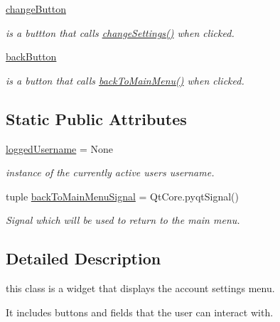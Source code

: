 \begin{DoxyCompactItemize}
\hyperlink{classsrc_1_1settings__menu_1_1_account_settings_menu_a6ad9267209290b0eaa3ef35191f81d82}{change\+Button}
\begin{DoxyCompactList}\small\item\em is a buttton that calls \hyperlink{classsrc_1_1settings__menu_1_1_account_settings_menu_a10989536edbbe0db4fc03f2e5ccc8271}{change\+Settings()} when clicked. \end{DoxyCompactList}\item 
\hyperlink{classsrc_1_1settings__menu_1_1_account_settings_menu_a80552690cf6643721ebc00319289468a}{back\+Button}
\begin{DoxyCompactList}\small\item\em is a button that calls \hyperlink{classsrc_1_1settings__menu_1_1_account_settings_menu_a47dc6e6cb8a9ca5431a32ad73298ed81}{back\+To\+Main\+Menu()} when clicked. \end{DoxyCompactList}\end{DoxyCompactItemize}
\subsection*{Static Public Attributes}
\begin{DoxyCompactItemize}
\item 
\hyperlink{classsrc_1_1settings__menu_1_1_account_settings_menu_a7cac3d6c4fd01c1d0c9e6cfcba8e8950}{logged\+Username} = None
\begin{DoxyCompactList}\small\item\em instance of the currently active user\textquotesingle{}s username. \end{DoxyCompactList}\item 
tuple \hyperlink{classsrc_1_1settings__menu_1_1_account_settings_menu_a968b438c9430d659dcb90a23689127be}{back\+To\+Main\+Menu\+Signal} = Qt\+Core.\+pyqt\+Signal()
\begin{DoxyCompactList}\small\item\em Signal which will be used to return to the main menu. \end{DoxyCompactList}\end{DoxyCompactItemize}


\subsection{Detailed Description}
this class is a widget that displays the account settings menu. 

It includes buttons and fields that the user can interact with.~\newline
 

